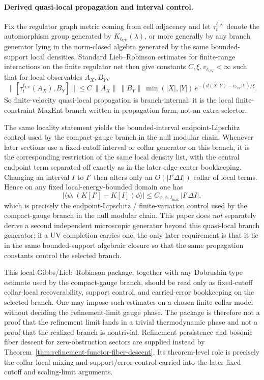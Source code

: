 \documentclass[11pt]{article}
\begin{document}
\paragraph{Derived quasi-local propagation and interval control.}
Fix the regulator graph metric coming from cell adjacency and let \(\tau_t^{\ell_{\mathrm{UV}}}\) denote the automorphism group generated by \(K_{\ell_{\mathrm{UV}}}(\lambda)\), or more generally by any branch generator lying in the norm-closed algebra generated by the same bounded-support local densities. Standard Lieb--Robinson estimates for finite-range interactions on the finite regulator net then give constants \(C,\xi,v_{\ell_{\mathrm{UV}}}<\infty\) such that for local observables \(A_X,B_Y\), \cite{liebRobinson72}
\[
\bigl\|[\tau_t^{\ell_{\mathrm{UV}}}(A_X),B_Y]\bigr\|
\le
C\,\|A_X\|\,\|B_Y\|\,\min(|X|,|Y|)\,
e^{-(d(X,Y)-v_{\ell_{\mathrm{UV}}}|t|)/\xi}.
\]
So finite-velocity quasi-local propagation is branch-internal: it is the local finite-constraint MaxEnt branch written in propagation form, not an extra selector.

The same locality statement yields the bounded-interval endpoint-Lipschitz control used by the compact-gauge branch in the null modular chain. Whenever later sections use a fixed-cutoff interval or collar generator on this branch, it is the corresponding restriction of the same local density list, with the central endpoint term separated off exactly as in the later edge-center bookkeeping. Changing an interval \(I\) to \(I'\) then alters only an \(O(|I'\Delta I|)\) collar of local terms. Hence on any fixed local-energy-bounded domain one has
\[
\left|\langle\psi,(K[I']-K[I])\phi\rangle\right|
\le
C_{\psi,\phi,I_{\max}}\,|I'\Delta I|,
\]
which is precisely the endpoint-Lipschitz / finite-variation control used by the compact-gauge branch in the null modular chain. This paper does \emph{not} separately derive a second independent microscopic generator beyond this quasi-local branch generator; if a UV completion carries one, the only later requirement is that it lie in the same bounded-support algebraic closure so that the same propagation constants control the selected branch.

This local-Gibbs/Lieb--Robinson package, together with any Dobrushin-type estimate used by the compact-gauge branch, should be read only as fixed-cutoff collar-local recoverability, support control, and carried-error bookkeeping on the selected branch. One may impose such estimates on a chosen finite collar model without deciding the refinement-limit gauge phase. The package is therefore not a proof that the refinement limit lands in a trivial thermodynamic phase and not a proof that the realized branch is nontrivial. Refinement persistence and bosonic fiber descent for zero-obstruction sectors are supplied instead by Theorem~\ref{thm:refinement-functor-fiber-descent}. Its theorem-level role is precisely the collar-local mixing and support/error control carried into the later fixed-cutoff and scaling-limit arguments.
\end{document}
